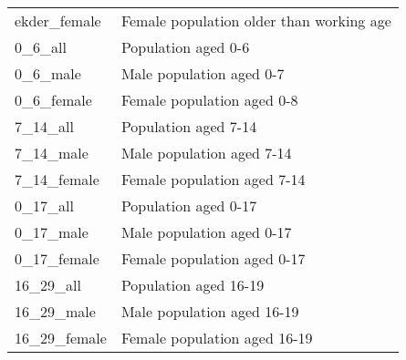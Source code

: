 \begin{longtable}[c]{ll}
    ekder\_female                              & Female population older than  working age                                                                                 \\
    0\_6\_all                                  & Population aged 0-6                                                                                                       \\
    0\_6\_male                                 & Male population aged 0-7                                                                                                  \\
    0\_6\_female                               & Female population aged 0-8                                                                                                \\
    7\_14\_all                                 & Population aged  7-14                                                                                                     \\
    7\_14\_male                                & Male population aged 7-14                                                                                                 \\
    7\_14\_female                              & Female population aged 7-14                                                                                               \\
    0\_17\_all                                 & Population aged 0-17                                                                                                      \\
    0\_17\_male                                & Male population aged 0-17                                                                                                 \\
    0\_17\_female                              & Female population aged 0-17                                                                                               \\
    16\_29\_all                                & Population aged 16-19                                                                                                     \\
    16\_29\_male                               & Male population aged 16-19                                                                                                \\
    16\_29\_female                             & Female population aged 16-19                                                                                              \\

\end{longtable}
